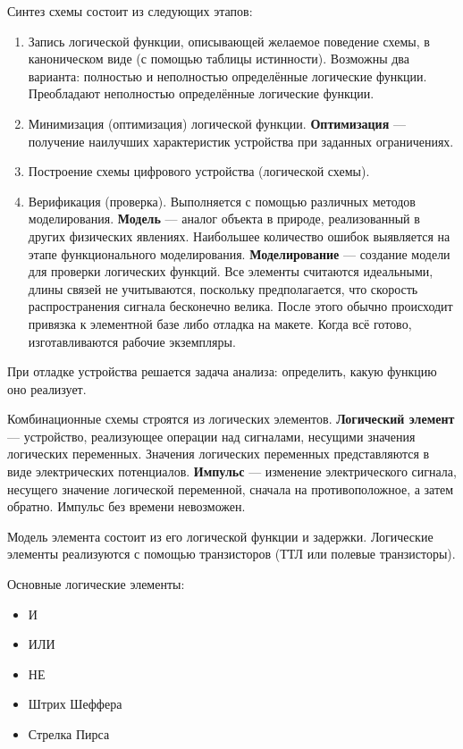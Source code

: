 \documentclass[12px]{article}
\begin{document}
Синтез схемы состоит из следующих этапов:
\begin{enumerate}
	\item Запись логической функции, описывающей желаемое поведение схемы, в каноническом виде (с помощью таблицы истинности). Возможны два варианта: полностью и неполностью определённые логические функции. Преобладают неполностью определённые логические функции.
	\item Минимизация (оптимизация) логической функции.  
	\textbf{Оптимизация} — получение наилучших характеристик устройства при заданных ограничениях.
	\item Построение схемы цифрового устройства (логической схемы).
	\item Верификация (проверка). Выполняется с помощью различных методов моделирования.  
	\textbf{Модель} — аналог объекта в природе, реализованный в других физических явлениях. Наибольшее количество ошибок выявляется на этапе функционального моделирования.  
	\textbf{Моделирование} — создание модели для проверки логических функций. Все элементы считаются идеальными, длины связей не учитываются, поскольку предполагается, что скорость распространения сигнала бесконечно велика. После этого обычно происходит привязка к элементной базе либо отладка на макете. Когда всё готово, изготавливаются рабочие экземпляры.
\end{enumerate}

При отладке устройства решается задача анализа: определить, какую функцию оно реализует.

Комбинационные схемы строятся из логических элементов.  
\textbf{Логический элемент} — устройство, реализующее операции над сигналами, несущими значения логических переменных. Значения логических переменных представляются в виде электрических потенциалов.  
\textbf{Импульс} — изменение электрического сигнала, несущего значение логической переменной, сначала на противоположное, а затем обратно. Импульс без времени невозможен.

Модель элемента состоит из его логической функции и задержки. Логические элементы реализуются с помощью транзисторов (ТТЛ или полевые транзисторы).

Основные логические элементы:
\begin{itemize}
	\item И
	\item ИЛИ
	\item НЕ
	\item Штрих Шеффера
	\item Стрелка Пирса
\end{itemize}
\end{document}
